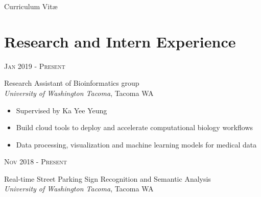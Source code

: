 \documentclass[10pt]{article} %
\begin{document}
\color{text1} %


\par{%
{\color{headings}\zapfino Curriculum {Vit\zapfino \ae}\\[15pt]\par} %


\begin{minipage}[t]{0.5\textwidth} %
\vspace{0pt} %


\section{Research and Intern Experience}

{\raggedleft\textsc{Jan 2019 - Present}\par}

{\raggedright\large Research Assistant of Bioinformatics group\\
\textit{University of Washington Tacoma}, Tacoma WA\\[5pt]}

\normalsize{\begin{itemize}
		\item Supervised by Ka Yee Yeung
		\item Build cloud tools to deploy and accelerate computational biology workflows
		\item Data processing, visualization and machine learning models for medical data
\end{itemize}}

{\raggedleft\textsc{Nov 2018 - Present}\par}

{\raggedright\large Real-time Street Parking Sign Recognition and Semantic Analysis\\
\textit{University of Washington Tacoma}, Tacoma WA\\[5pt]}


\end{minipage}}
\end{document}
